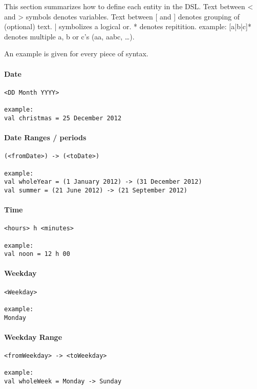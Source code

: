 This section summarizes how to define each entity in the DSL.
Text between < and > symbols denotes variables.
Text between [ and ] denotes grouping of (optional) text. | symbolizes a logical or. * denotes repitition.
example: [a|b|c]* denotes multiple a, b or c's (aa, aabc, \dots).

An example is given for every piece of syntax.

\paragraph{Date}\hfill
\begin{lstlisting}
<DD Month YYYY>

example:
val christmas = 25 December 2012
\end{lstlisting}
		
\paragraph{Date Ranges / periods}\hfill
\begin{lstlisting}
(<fromDate>) -> (<toDate>)

example:
val wholeYear = (1 January 2012) -> (31 December 2012)
val summer = (21 June 2012) -> (21 September 2012)
\end{lstlisting}
		
\paragraph{Time}\hfill
\begin{lstlisting}
<hours> h <minutes>

example:
val noon = 12 h 00
\end{lstlisting}

\paragraph{Weekday}\hfill
\begin{lstlisting}
<Weekday>

example:
Monday
\end{lstlisting}
	    
\paragraph{Weekday Range}\hfill
\begin{lstlisting}
<fromWeekday> -> <toWeekday>

example:
val wholeWeek = Monday -> Sunday
\end{lstlisting}

